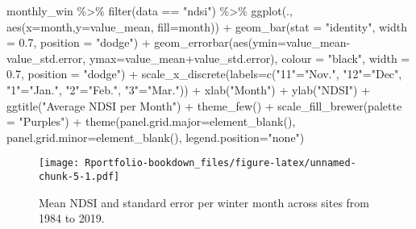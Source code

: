 \documentclass[
]{book}
\newenvironment{Shaded}{\begin{snugshade}}{\end{snugshade}}
\newcommand{\AttributeTok}[1]{\textcolor[rgb]{0.77,0.63,0.00}{#1}}
\newcommand{\FloatTok}[1]{\textcolor[rgb]{0.00,0.00,0.81}{#1}}
\newcommand{\FunctionTok}[1]{\textcolor[rgb]{0.00,0.00,0.00}{#1}}
\newcommand{\NormalTok}[1]{#1}
\newcommand{\OtherTok}[1]{\textcolor[rgb]{0.56,0.35,0.01}{#1}}
\newcommand{\SpecialCharTok}[1]{\textcolor[rgb]{0.00,0.00,0.00}{#1}}
\newcommand{\StringTok}[1]{\textcolor[rgb]{0.31,0.60,0.02}{#1}}
\begin{document}
\begin{Shaded}
\begin{Highlighting}[]
\NormalTok{monthly\_win }\SpecialCharTok{\%\textgreater{}\%}
  \FunctionTok{filter}\NormalTok{(data }\SpecialCharTok{==} \StringTok{"ndsi"}\NormalTok{) }\SpecialCharTok{\%\textgreater{}\%}
\FunctionTok{ggplot}\NormalTok{(., }\FunctionTok{aes}\NormalTok{(}\AttributeTok{x=}\NormalTok{month,}\AttributeTok{y=}\NormalTok{value\_mean, }\AttributeTok{fill=}\NormalTok{month)) }\SpecialCharTok{+} 
  \FunctionTok{geom\_bar}\NormalTok{(}\AttributeTok{stat =} \StringTok{"identity"}\NormalTok{, }\AttributeTok{width =} \FloatTok{0.7}\NormalTok{, }\AttributeTok{position =} \StringTok{"dodge"}\NormalTok{) }\SpecialCharTok{+}
  \FunctionTok{geom\_errorbar}\NormalTok{(}\FunctionTok{aes}\NormalTok{(}\AttributeTok{ymin=}\NormalTok{value\_mean}\SpecialCharTok{{-}}\NormalTok{value\_std.error, }\AttributeTok{ymax=}\NormalTok{value\_mean}\SpecialCharTok{+}\NormalTok{value\_std.error), }
                \AttributeTok{colour =} \StringTok{"black"}\NormalTok{, }\AttributeTok{width =} \FloatTok{0.7}\NormalTok{, }\AttributeTok{position =} \StringTok{"dodge"}\NormalTok{) }\SpecialCharTok{+}
  \FunctionTok{scale\_x\_discrete}\NormalTok{(}\AttributeTok{labels=}\FunctionTok{c}\NormalTok{(}\StringTok{"11"}\OtherTok{=}\StringTok{"Nov."}\NormalTok{, }\StringTok{"12"}\OtherTok{=}\StringTok{"Dec"}\NormalTok{, }\StringTok{"1"}\OtherTok{=}\StringTok{"Jan."}\NormalTok{, }\StringTok{"2"}\OtherTok{=}\StringTok{"Feb."}\NormalTok{, }
                            \StringTok{"3"}\OtherTok{=}\StringTok{"Mar."}\NormalTok{)) }\SpecialCharTok{+}
  \FunctionTok{xlab}\NormalTok{(}\StringTok{"Month"}\NormalTok{) }\SpecialCharTok{+}  \FunctionTok{ylab}\NormalTok{(}\StringTok{"NDSI"}\NormalTok{) }\SpecialCharTok{+}
  \FunctionTok{ggtitle}\NormalTok{(}\StringTok{"Average NDSI per Month"}\NormalTok{) }\SpecialCharTok{+}
  \FunctionTok{theme\_few}\NormalTok{() }\SpecialCharTok{+}
  \FunctionTok{scale\_fill\_brewer}\NormalTok{(}\AttributeTok{palette =} \StringTok{"Purples"}\NormalTok{) }\SpecialCharTok{+}
  \FunctionTok{theme}\NormalTok{(}\AttributeTok{panel.grid.major=}\FunctionTok{element\_blank}\NormalTok{(), }\AttributeTok{panel.grid.minor=}\FunctionTok{element\_blank}\NormalTok{(), }
        \AttributeTok{legend.position=}\StringTok{"none"}\NormalTok{)}
\end{Highlighting}
\end{Shaded}

\begin{figure}
\centering
\texttt{[image: Rportfolio-bookdown\_files/figure-latex/unnamed-chunk-5-1.pdf]}
\caption{\label{fig:unnamed-chunk-5}Mean NDSI and standard error per winter month across sites from 1984 to 2019.}
\end{figure}
\end{document}
